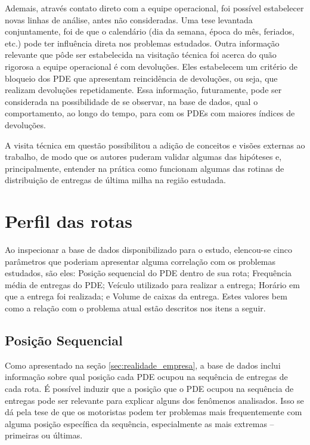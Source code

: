 Ademais, através contato direto com a equipe operacional, foi possível estabelecer novas linhas de análise, antes não consideradas. Uma tese levantada conjuntamente, foi de que o calendário (dia da semana, época do mês, feriados, etc.) pode ter influência direta nos problemas estudados. 
%
Outra informação relevante que pôde ser estabelecida na visitação técnica foi acerca do quão rigorosa a equipe operacional é com devoluções. Eles estabelecem um critério de bloqueio dos PDE que apresentam reincidência de devoluções, ou seja, que realizam devoluções repetidamente. Essa informação, futuramente, pode ser considerada na possibilidade de se observar, na base de dados, qual o comportamento, ao longo do tempo, para com os PDEs com maiores índices de devoluções.

A visita técnica em questão possibilitou a adição de conceitos e visões externas ao trabalho, de modo que os autores puderam validar algumas das hipóteses e, principalmente, entender na prática como funcionam algumas das rotinas de distribuição de entregas de última milha na região estudada.


\section{Perfil das rotas} \label{sec:analise_base_dados}

Ao inspecionar a base de dados disponibilizado para o estudo, elencou-se cinco parâmetros que poderiam apresentar alguma correlação com os problemas estudados, são eles: Posição sequencial do PDE dentro de sua rota; Frequência média de entregas do PDE; Veículo utilizado para realizar a entrega; Horário em que a entrega foi realizada; e Volume de caixas da entrega.
Estes valores bem como a relação com o problema atual estão descritos nos itens a seguir.

\subsection{Posição Sequencial}

Como apresentado na seção \ref{sec:realidade_empresa}, a base de dados inclui informação sobre qual posição cada PDE ocupou na sequência de entregas de cada rota.
É possível induzir que a posição que o PDE ocupou na sequência de entregas pode ser relevante para explicar alguns dos fenômenos analisados.
Isso se dá pela tese de que os motoristas podem ter problemas mais frequentemente com alguma posição específica da sequência, especialmente as mais extremas – primeiras ou últimas.

